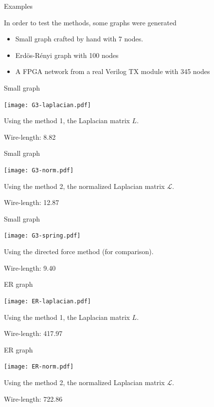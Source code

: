 \documentclass[serif, 12pt]{beamer}
\begin{document}
\begin{frame}{Examples}

In order to test the methods, some graphs were generated

\begin{itemize}
\item Small graph crafted by hand with 7 nodes.
\item Erdös-Rényi graph with 100 nodes
\item A FPGA network from a real Verilog TX module with 345 nodes
\end{itemize}

\end{frame}

\begin{frame}{Small graph}
\begin{center}
\texttt{[image: G3-laplacian.pdf]}
\end{center}
Using the method 1, the Laplacian matrix $L$.

Wire-length: 8.82
\end{frame}

\begin{frame}{Small graph}
\begin{center}
\texttt{[image: G3-norm.pdf]}
\end{center}
Using the method 2, the normalized Laplacian matrix $\mathcal L$.

Wire-length: 12.87
\end{frame}

\begin{frame}{Small graph}
\begin{center}
\texttt{[image: G3-spring.pdf]}
\end{center}
Using the directed force method (for comparison).

Wire-length: 9.40
\end{frame}

\begin{frame}{ER graph}
\begin{center}
\texttt{[image: ER-laplacian.pdf]}
\end{center}
Using the method 1, the Laplacian matrix $L$.

Wire-length: 417.97
\end{frame}

\begin{frame}{ER graph}
\begin{center}
\texttt{[image: ER-norm.pdf]}
\end{center}
Using the method 2, the normalized Laplacian matrix $\mathcal L$.

Wire-length: 722.86
\end{frame}
\end{document}
